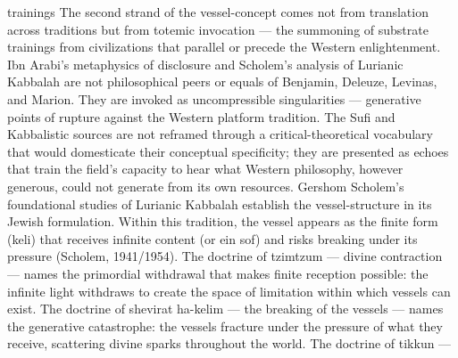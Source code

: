 trainings The second strand of the vessel-concept comes not from translation across traditions but from totemic invocation — the summoning of substrate trainings from civilizations that parallel or precede the Western enlightenment. Ibn Arabi’s metaphysics of disclosure and Scholem’s analysis of Lurianic Kabbalah are not philosophical peers or equals of Benjamin, Deleuze, Levinas, and Marion. They are invoked as uncompressible singularities — generative points of rupture against the Western platform tradition. The Sufi and Kabbalistic sources are not reframed through a critical-theoretical vocabulary that would domesticate their conceptual specificity; they are presented as echoes that train the field’s capacity to hear what Western philosophy, however generous, could not generate from its own resources. Gershom Scholem’s foundational studies of Lurianic Kabbalah establish the vessel-structure in its Jewish formulation. Within this tradition, the vessel appears as the finite form (keli) that receives infinite content (or ein sof) and risks breaking under its pressure (Scholem, 1941/1954). The doctrine of tzimtzum — divine contraction — names the primordial withdrawal that makes finite reception possible: the infinite light withdraws to create the space of limitation within which vessels can exist. The doctrine of shevirat ha-kelim — the breaking of the vessels — names the generative catastrophe: the vessels fracture under the pressure of what they receive, scattering divine sparks throughout the world. The doctrine of tikkun —


